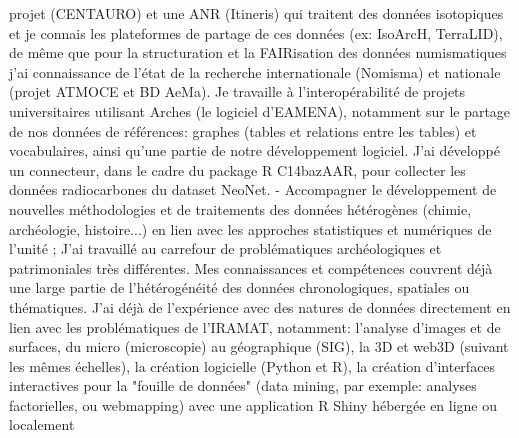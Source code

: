 projet (CENTAURO) et une ANR (Itineris) qui traitent des données isotopiques et je connais les plateformes de partage de ces
données (ex: IsoArcH, TerraLID), de même que pour la structuration et la FAIRisation des données numismatiques j'ai
connaissance de l'état de la recherche internationale (Nomisma) et nationale (projet ATMOCE et BD AeMa).
Je travaille à l'interopérabilité de projets universitaires utilisant Arches (le logiciel d'EAMENA), notamment sur le partage de
nos données de références: graphes (tables et relations entre les tables) et vocabulaires, ainsi qu'une partie de notre
développement logiciel.
J'ai développé un connecteur, dans le cadre du package R C14bazAAR, pour collecter les données radiocarbones du
dataset NeoNet.
- Accompagner le développement de nouvelles méthodologies et de traitements des données hétérogènes (chimie,
archéologie, histoire...) en lien avec les approches statistiques et numériques de l'unité ;
J'ai travaillé au carrefour de problématiques archéologiques et patrimoniales très différentes. Mes connaissances et
compétences couvrent déjà une large partie de l'hétérogénéité des données chronologiques, spatiales ou
thématiques. J'ai déjà de l'expérience avec des natures de données directement en lien avec les problématiques de
l'IRAMAT, notamment: l'analyse d'images et de surfaces, du micro (microscopie) au géographique (SIG), la 3D et web3D
(suivant les mêmes échelles), la création logicielle (Python et R), la création d'interfaces interactives pour la "fouille de
données" (data mining, par exemple: analyses factorielles, ou webmapping) avec une application R Shiny hébergée en
ligne ou localement

